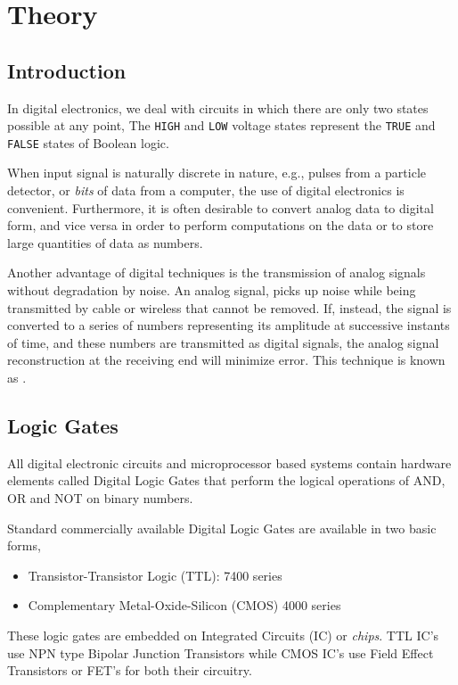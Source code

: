 \section{Theory}
\subsection*{Introduction}

In digital electronics, we deal with circuits in which there are only two states possible at any point, The \verb|HIGH| and \verb|LOW| voltage states represent the \verb|TRUE| and \verb|FALSE| states of Boolean logic.

When input signal is naturally discrete in nature, e.g., pulses from a particle detector, or \textit{bits} of data from a computer, the use of digital electronics is convenient. Furthermore, it is often desirable to convert analog data to digital form, and vice versa in order to perform computations on the data or to store large quantities of data as numbers.

Another advantage of digital techniques is the transmission of analog signals without
degradation by noise. An analog signal, picks up noise while being transmitted by cable or wireless that cannot be removed. If, instead, the signal is converted to a series of numbers representing its amplitude at successive instants of time, and these numbers are transmitted as digital signals, the analog signal reconstruction at
the receiving end will minimize error.
This technique is known as .

\subsection*{Logic Gates}

All digital electronic circuits and microprocessor based systems contain hardware elements called Digital Logic Gates that perform the logical operations of AND, OR and NOT on binary numbers.

Standard commercially available Digital Logic Gates are available in two basic forms, 

\begin{itemize}
    \item Transistor-Transistor Logic (TTL): 7400 series
    \item Complementary Metal-Oxide-Silicon (CMOS) 4000 series
\end{itemize}

These logic gates are embedded on Integrated Circuits (IC) or \textit{chips}. TTL IC's use NPN type Bipolar Junction Transistors while CMOS IC's use Field Effect Transistors or FET's for both their circuitry.\\

